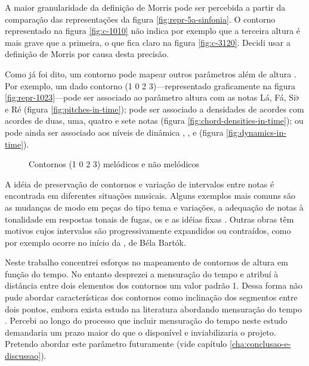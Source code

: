A maior granularidade da definição de Morris pode ser percebida a
partir da comparação das representações da figura
\ref{fig:repr-5a-sinfonia}. O contorno representado na figura
\ref{fig:c-1010} não indica por exemplo que a terceira altura é mais
grave que a primeira, o que fica claro na figura
\ref{fig:c-3120}. Decidi usar a definição de Morris por causa desta
precisão.

Como já foi dito, um contorno pode mapear outros parâmetros além de
altura \cite[p. 206]{morris93:directions}
\cite[p. 22]{clifford95:contour}. Por exemplo, um dado contorno (1 0 2
3)---representado graficamente na figura \ref{fig:repr-1023}---pode
ser associado ao parâmetro altura com as notas Lá, Fá, Si$\flat$ e Ré
(figura \ref{fig:pitches-in-time}); pode ser associado a densidades de
acordes com acordes de duas, uma, quatro e sete notas (figura
\ref{fig:chord-densities-in-time}); ou pode ainda ser associado aos
níveis de dinâmica , ,  e 
(figura \ref{fig:dynamics-in-time}).

\begin{figure}
  \centering

  \caption{Contornos (1 0 2 3) melódicos e não melódicos}
  \label{fig:non-melodic-contours}
\end{figure}

A idéia de preservação de contornos e variação de intervalos entre
notas é encontrada em diferentes situações musicais. Alguns exemplos
mais comuns são as mudanças de modo em peças do tipo tema e variações,
a adequação de notas à tonalidade em respostas tonais de fugas, os
 e as idéias fixas
\cite[p. 29]{morris87:composition}. Outras obras têm motivos cujos
intervalos são progressivamente expandidos ou contraídos, como por
exemplo ocorre no início da , de Béla Bartók.

Neste trabalho concentrei esforços no mapeamento de contornos de
altura em função do tempo. No entanto desprezei a mensuração do tempo
e atribuí à distância entre dois elementos dos contornos um valor
padrão 1. Dessa forma não pude abordar características dos contornos
como inclinação dos segmentos entre dois pontos, embora exista estudo
na literatura abordando mensuração do tempo
\cite{beard03:contour}. Percebi ao longo do processo que incluir
mensuração do tempo neste estudo demandaria um prazo maior do que o
disponível e inviabilizaria o projeto. Pretendo abordar este parâmetro
futuramente (vide capítulo \ref{cha:conclusao-e-discussao}).

